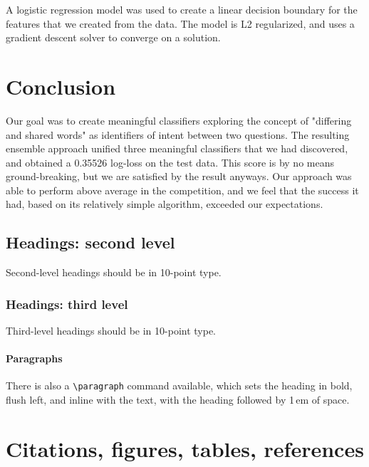 \documentclass{article}
\begin{document}
A logistic regression model was used to create a linear decision boundary for the features that we created from the data. The model is L2 regularized, and uses a gradient descent solver to converge on a solution. 

\section{Conclusion}
\label{headings}

Our goal was to create meaningful classifiers exploring the concept of "differing and shared words" as identifiers of intent between two questions. The resulting ensemble approach unified three meaningful classifiers that we had discovered, and obtained a 0.35526 log-loss on the test data. This score is by no means ground-breaking, but we are satisfied by the result anyways. Our approach was able to perform above average in the competition, and we feel that the success it had, based on its relatively simple algorithm, exceeded our expectations.

\subsection{Headings: second level}

Second-level headings should be in 10-point type.

\subsubsection{Headings: third level}

Third-level headings should be in 10-point type.

\paragraph{Paragraphs}

There is also a \verb+\paragraph+ command available, which sets the
heading in bold, flush left, and inline with the text, with the
heading followed by 1\,em of space.

\section{Citations, figures, tables, references}
\label{others}
\end{document}
